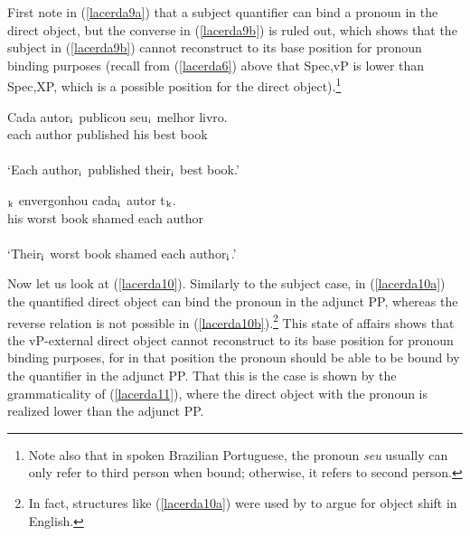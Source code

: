 \documentclass[output=paper]{langscibook}
\begin{document}
First note in (\ref{lacerda9a}) that a subject quantifier can bind a pronoun in the direct object, but the converse in (\ref{lacerda9b}) is ruled out, which shows that the subject in (\ref{lacerda9b}) cannot reconstruct to its base position for pronoun binding purposes (recall from (\ref{lacerda6}) above that Spec,vP is lower than Spec,XP, which is a possible position for the direct object).\footnote{Note also that in spoken Brazilian Portuguese, the pronoun \emph{seu} usually can only refer to third person when bound; otherwise, it refers to second person.}



\begin{exe}
\ex \label{lacerda9}
\begin{xlist}
\ex \label{lacerda9a}
\gll Cada autor$_{\textnormal{i}}$	publicou	seu$_{\textnormal{i}}$ melhor	livro.\\
each	author	published	his	best	book\\\\
‘Each author$_{\textnormal{i}}$ published their$_{\textnormal{i}}$ best book.’

\ex \label{lacerda9b}
$_{\textnormal{k}}$	envergonhou	cada$_{\textnormal{i}}$	autor 	t$_{\textnormal{k}}$.\\
his	worst	book	shamed	each	author\\\\
‘Their$_{\textnormal{i}}$ worst book shamed each author$_{\textnormal{i}}$.’
\end{xlist}

\end{exe}

Now let us look at (\ref{lacerda10}). Similarly to the subject case, in (\ref{lacerda10a}) the quantified direct object can bind the pronoun in the adjunct PP, whereas the reverse relation is not possible in (\ref{lacerda10b}).\footnote{In fact, structures like (\ref{lacerda10a}) were used by \citet{LasnikSaito1991} to argue for object shift in English.}  This state of affairs shows that the vP-external direct object cannot reconstruct to its base position for pronoun binding purposes, for in that position the pronoun should be able to be bound by the quantifier in the adjunct PP. That this is the case is shown by the grammaticality of (\ref{lacerda11}), where the direct object with the pronoun is realized lower than the adjunct PP.
\end{document}
